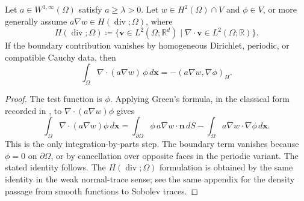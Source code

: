 \begin{lemma}
    \label{lem:app-ch2-rectangular-green}
    Let \(a\in W^{1,\infty}(\Omega)\) satisfy \(a\ge\lambda>0\). Let \(w\in H^2(\Omega)\cap V\) and \(\phi\in V\), or more generally assume \(a\nabla w\in H(\operatorname{div};\Omega)\), where
    \[
        H(\operatorname{div};\Omega) \coloneqq \{ \mathbf{v} \in L^2(\Omega; \mathbb{R}^d) \mid \nabla \cdot \mathbf{v} \in L^2(\Omega; \mathbb{R}) \}.
    \]
    If the boundary contribution vanishes by homogeneous Dirichlet, periodic, or compatible Cauchy data, then
    \[
        \int_{\Omega}\nabla\!\cdot(a\nabla w)\,\phi\,d\mathbf{x}
        =
        -
        (a\nabla w,\nabla\phi)_H.
    \]
\end{lemma}
\begin{proof}
    The test function is \(\phi\). Applying Green's formula, in the classical form recorded in \cite[Appendix~C.2]{Evans_2010}, to \(\nabla\!\cdot(a\nabla w)\phi\) gives
    \[
        \int_{\Omega}\nabla\!\cdot(a\nabla w)\phi\,d\mathbf{x}
        =
        \int_{\partial\Omega}\phi\,a\nabla w\cdot\mathbf{n}\,dS
        -
        \int_{\Omega}a\nabla w\cdot\nabla\phi\,d\mathbf{x}.
    \]
    This is the only integration-by-parts step. The boundary term vanishes because \(\phi=0\) on \(\partial\Omega\), or by cancellation over opposite faces in the periodic variant. The stated identity follows. The \(H(\operatorname{div};\Omega)\) formulation is obtained by the same identity in the weak normal-trace sense; see the same appendix for the density passage from smooth functions to Sobolev traces.
\end{proof}

